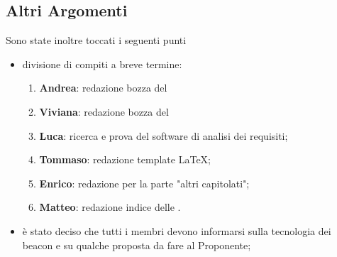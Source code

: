 \documentclass[a4paper,titlepage]{article}
\begin{document}
\subsection{Altri Argomenti}
\label{sub:AltriArgomenti}

Sono state inoltre toccati i seguenti punti

\begin{itemize}
  \item divisione di compiti a breve termine:
  \begin{enumerate}
  	\item \textbf{Andrea}: redazione bozza del 
  	\item \textbf{Viviana}: redazione bozza del 
  	\item \textbf{Luca}: ricerca e prova del software di analisi dei requisiti;
  	\item \textbf{Tommaso}: redazione template \LaTeX;
  	\item \textbf{Enrico}: redazione  per la parte "altri capitolati";
  	\item \textbf{Matteo}: redazione indice delle .
  \end{enumerate}
  \item è stato deciso che tutti i membri devono informarsi sulla tecnologia dei beacon e su qualche proposta da fare al Proponente;
\end{itemize}
\end{document}
